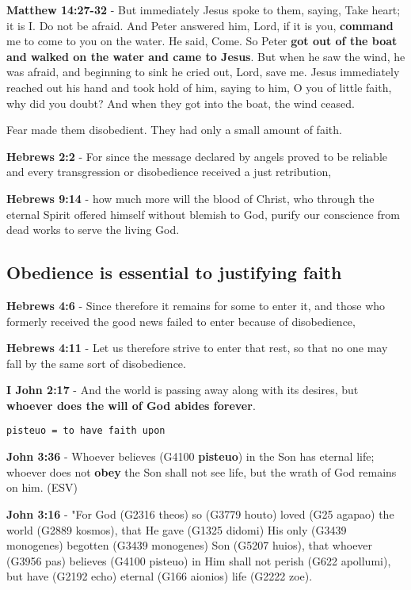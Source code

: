 \documentclass[11pt]{article}
\begin{document}
\textbf{Matthew 14:27-32} - But immediately Jesus spoke to them, saying, Take heart; it is I. Do not be afraid. And Peter answered him, Lord, if it is you, \textbf{command} me to come to you on the water. He said, Come. So Peter \textbf{got out of the boat and walked on the water and came to Jesus}. But when he saw the wind, he was afraid, and beginning to sink he cried out, Lord, save me. Jesus immediately reached out his hand and took hold of him, saying to him, O you of little faith, why did you doubt? And when they got into the boat, the wind ceased.

Fear made them disobedient. They had only a small amount of faith.

\textbf{Hebrews 2:2} - For since the message declared by angels proved to be reliable and every transgression or disobedience received a just retribution,

\textbf{Hebrews 9:14} - how much more will the blood of Christ, who through the eternal Spirit offered himself without blemish to God, purify our conscience from dead works to serve the living God.

\subsection{Obedience is essential to justifying faith}
\label{sec:org3257554}
\textbf{Hebrews 4:6} - Since therefore it remains for some to enter it, and those who formerly received the good news failed to enter because of disobedience,

\textbf{Hebrews 4:11} - Let us therefore strive to enter that rest, so that no one may fall by the same sort of disobedience.

\textbf{I John 2:17} - And the world is passing away along with its desires, but \textbf{whoever does the will of God abides forever}.

\texttt{pisteuo = to have faith upon}

\textbf{John 3:36} - Whoever believes (G4100 \textbf{pisteuo}) in the Son has eternal life; whoever does not \textbf{obey} the Son shall not see life, but the wrath of God remains on him. (ESV)

\textbf{John 3:16} - "For God (G2316 theos) so (G3779 houto) loved (G25 agapao) the world (G2889 kosmos), that He gave (G1325 didomi) His only (G3439 monogenes) begotten (G3439 monogenes) Son (G5207 huios), that whoever (G3956 pas) believes (G4100 pisteuo) in Him shall not perish (G622 apollumi), but have (G2192 echo) eternal (G166 aionios) life (G2222 zoe).
\end{document}
